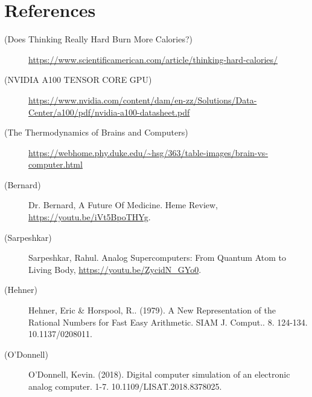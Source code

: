 \newpage
\section*{References}

\newcommand{\source}[2]{
\item [({#1})]{#2}
}

\begin{description}
\source{Does Thinking Really Hard Burn More Calories?}{\url{https://www.scientificamerican.com/article/thinking-hard-calories/}}
\source{NVIDIA A100
TENSOR CORE GPU}{\url{https://www.nvidia.com/content/dam/en-zz/Solutions/Data-Center/a100/pdf/nvidia-a100-datasheet.pdf}}
\source{The Thermodynamics of Brains and Computers}{\url{https://webhome.phy.duke.edu/~hsg/363/table-images/brain-vs-computer.html}}
\source{Bernard}{Dr. Bernard, A Future Of Medicine. Heme Review, \url{https://youtu.be/iVt5BpoTHYg}.}
\source{Sarpeshkar}{Sarpeshkar, Rahul. Analog Supercomputers: From Quantum Atom to Living Body, \url{https://youtu.be/ZycidN_GYo0}.}
\source{Hehner}{Hehner, Eric \& Horspool, R.. (1979). A New Representation of the Rational Numbers for Fast Easy Arithmetic. SIAM J. Comput.. 8. 124-134. 10.1137/0208011.}
\source{O'Donnell}{O'Donnell, Kevin. (2018). Digital computer simulation of an electronic analog computer. 1-7. 10.1109/LISAT.2018.8378025. }
\end{description}


